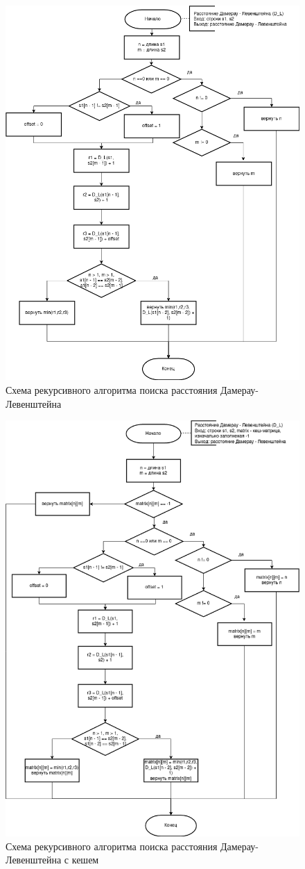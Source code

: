 \documentclass[12pt]{report}
\begin{document}
	\begin{figure}[H]
		\centering
		\includegraphics[width=0.8\linewidth]{DamLevRec}
		\caption{Схема рекурсивного алгоритма поиска расстояния Дамерау-Левенштейна}
		\label{fig:schema_selection}
	\end{figure}
	
	\begin{figure}[H]
		\centering
		\includegraphics[width=0.8\linewidth]{DamLevRecHash}
		\caption{Схема рекурсивного алгоритма поиска расстояния Дамерау-Левенштейна с кешем}
		\label{fig:schema_selection}
	\end{figure}
	
\end{document}
